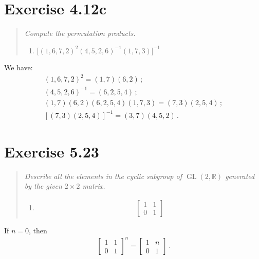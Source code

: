 \documentclass{article}
\DeclareMathOperator{\GL}{GL}
\begin{document}
\qedsymbol

\section*{Exercise 4.12c}

\begin{quote}
    \itshape
    Compute the permutation products.

    \begin{enumerate}[label=\alph*., start=3]
        \item $\bigl[(1,6,7,2)^2(4,5,2,6)^{-1}(1,7,3)\bigr]^{-1}$
    \end{enumerate}
\end{quote}
We have:
\begin{align*}
    (1,6,7,2)^2 = (1, 7)(6, 2) \,; \\
    (4, 5, 2, 6)^{-1} = (6,2,5,4) \,; \\
    (1,7)(6,2)(6,2,5,4)(1,7,3) = (7,3)(2, 5, 4) \,; \\
    [(7,3)(2,5,4)]^{-1} = (3, 7)(4, 5, 2) \,.
\end{align*}

\section*{Exercise 5.23}

\begin{quote}
    \itshape
    Describe all the elements in the cyclic subgroup of
    $\GL(2,\mathbb{R})$ generated by the given $2\times2$ matrix.

    \begin{enumerate}[start=24]
        \item \begin{align*}
            \begin{bmatrix}
                1 & 1 \\
                0 & 1
            \end{bmatrix}
        \end{align*}
    \end{enumerate}
\end{quote}

If $n = 0$, then
\begin{align*}
    \begin{bmatrix}
        1&1\\
        0&1
    \end{bmatrix}^n = \begin{bmatrix}
        1&n\\
        0&1
    \end{bmatrix} \,.
\end{align*}
\end{document}

